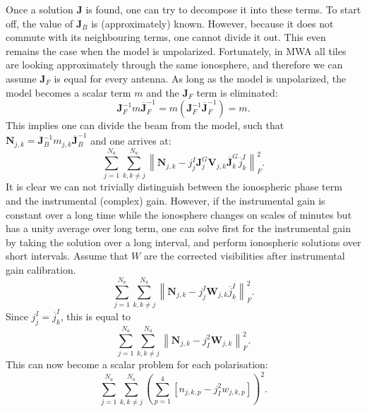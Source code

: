 \documentclass[a4paper,11pt]{article}
\begin{document}
Once a solution $\mathbf{J}$ is found, one can try to decompose it into these terms. To start off, the value of $\mathbf{J}_B$ is (approximately) known. However, because it does not commute with its neighbouring terms, one cannot divide it out. This even remains the case when the model is unpolarized. Fortunately, in MWA all tiles are looking approximately through the same ionosphere, and therefore we can assume $\mathbf{J}_F$ is equal for every antenna. As long as the model is unpolarized, the model becomes a scalar term $m$ and the $\mathbf{J}_F$ term is eliminated:
\begin{equation}
 \mathbf{J}_F^{-1} m \overline{\mathbf{J}}_F^{-1} = m \left( \mathbf{J}_F^{-1} \overline{\mathbf{J}}_F^{-1} \right) = m.
\end{equation}
This implies one can divide the beam from the model, such that $\mathbf{N}_{j,k} = \mathbf{J}_B^{-1}m_{j,k}\overline{\mathbf{J}}_B^{-1}$ and one arrives at:
\begin{equation}
 \sum\limits_{j=1}^{N_a} \sum\limits_{k,k\neq j}^{N_a} \left\| \mathbf{N}_{j,k} - j_j^I \mathbf{J}^G_j \mathbf{V}_{j,k} \overline{\mathbf{J}}_k^G \overline{j}_k^I \right\|^2_F.
\end{equation}
It is clear we can not trivially distinguish between the ionospheric phase term and the instrumental (complex) gain. However, if the instrumental gain is constant over a long time while the ionosphere changes on scales of minutes but has a unity average over long term, one can solve first for the instrumental gain by taking the solution over a long interval, and perform ionospheric solutions over short intervals. Assume that $W$ are the corrected visibilities after instrumental gain calibration.
\begin{equation}
 \sum\limits_{j=1}^{N_a} \sum\limits_{k,k\neq j}^{N_a} \left\| \mathbf{N}_{j,k} - j_j^I \mathbf{W}_{j,k} \overline{j}_k^I \right\|^2_F.
\end{equation}
Since $j_j^I = \overline{j}^I_k$, this is equal to
\begin{equation}
 \sum\limits_{j=1}^{N_a} \sum\limits_{k,k\neq j}^{N_a} \left\| \mathbf{N}_{j,k} - j_I^2 \mathbf{W}_{j,k} \right\|^2_F.
\end{equation}
This can now become a scalar problem for each polarisation:
\begin{equation}
 \sum\limits_{j=1}^{N_a} \sum\limits_{k,k\neq j}^{N_a} \left( \sum\limits_{p=1}^4 \left[ n_{j,k,p} - j_I^2 w_{j,k,p} \right] \right)^2.
\end{equation}
\end{document}
